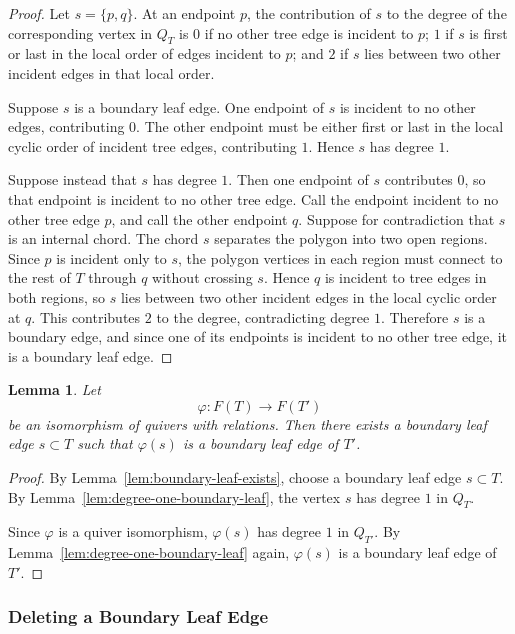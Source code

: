 \documentclass[12pt]{amsart}
\newtheorem{lem}[thm]{Lemma}
\theoremstyle{definition}
\theoremstyle{remark}
\numberwithin{equation}{section}
\begin{document}
\begin{proof}
Let \(s=\{p,q\}\). At an endpoint \(p\), the contribution of \(s\) to the degree of the corresponding vertex in \(Q_T\) is \(0\) if no other tree edge is incident to \(p\); \(1\) if \(s\) is first or last in the local order of edges incident to \(p\); and \(2\) if \(s\) lies between two other incident edges in that local order.

Suppose \(s\) is a boundary leaf edge. One endpoint of \(s\) is incident to no other edges, contributing \(0\). The other endpoint must be either first or last in the local cyclic order of incident tree edges, contributing \(1\). Hence \(s\) has degree \(1\).

Suppose instead that \(s\) has degree \(1\). Then one endpoint of \(s\) contributes \(0\), so that endpoint is incident to no other tree edge. Call the endpoint incident to no other tree edge \(p\), and call the other endpoint \(q\). Suppose for contradiction that \(s\) is an internal chord. The chord \(s\) separates the polygon into two open regions. Since \(p\) is incident only to \(s\), the polygon vertices in each region must connect to the rest of \(T\) through \(q\) without crossing \(s\). Hence \(q\) is incident to tree edges in both regions, so \(s\) lies between two other incident edges in the local cyclic order at \(q\). This contributes \(2\) to the degree, contradicting degree \(1\). Therefore \(s\) is a boundary edge, and since one of its endpoints is incident to no other tree edge, it is a boundary leaf edge.
\end{proof}

\begin{lem}\label{lem:boundary-leaf-detect}
Let
\[
\varphi:F(T)\to F(T')
\]
be an isomorphism of quivers with relations. Then there exists a boundary leaf edge \(s\subset T\) such that \(\varphi(s)\) is a boundary leaf edge of \(T'\).
\end{lem}

\begin{proof}
By Lemma~\ref{lem:boundary-leaf-exists}, choose a boundary leaf edge \(s\subset T\). By Lemma~\ref{lem:degree-one-boundary-leaf}, the vertex \(s\) has degree \(1\) in \(Q_T\).

Since \(\varphi\) is a quiver isomorphism, \(\varphi(s)\) has degree \(1\) in \(Q_{T'}\). By Lemma~\ref{lem:degree-one-boundary-leaf} again, \(\varphi(s)\) is a boundary leaf edge of \(T'\).
\end{proof}

\subsubsection{Deleting a Boundary Leaf Edge}
\end{document}
